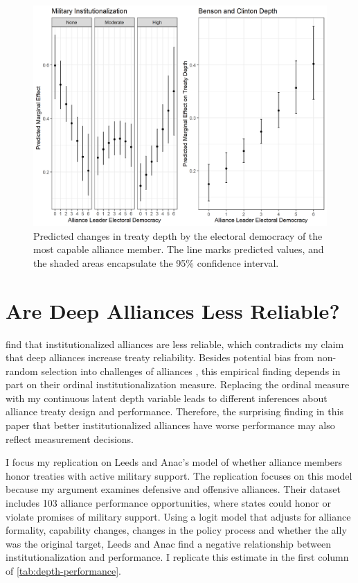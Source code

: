 \documentclass[12pt]{article}
\begin{document}
\begin{figure}
\includegraphics[width=.95\textwidth]{results-alt-measures-sep.png}  
\caption{Predicted changes in treaty depth by the electoral democracy of the most capable alliance member. The line marks predicted values, and the shaded areas encapsulate the 95\% confidence interval.}
\label{fig:results-alt-measures-sep}
\end{figure}



\section{Are Deep Alliances Less Reliable?} 


\citet{LeedsAnac2005} find that institutionalized alliances are less reliable, which contradicts my claim that deep alliances increase treaty reliability. 
Besides potential bias from non-random selection into challenges of alliances \citep{Smith1995}, this empirical finding depends in part on their ordinal institutionalization measure. 
Replacing the ordinal measure with my continuous latent depth variable leads to different inferences about alliance treaty design and performance. 
Therefore, the surprising finding in this paper that better institutionalized alliances have worse performance may also reflect measurement decisions. 


I focus my replication on Leeds and Anac's model of whether alliance members honor treaties with active military support. 
The replication focuses on this model because my argument examines defensive and offensive alliances. 
Their dataset includes 103 alliance performance opportunities, where states could honor or violate promises of military support. 
Using a logit model that adjusts for alliance formality, capability changes, changes in the policy process and whether the ally was the original target, Leeds and Anac find a negative relationship between institutionalization and performance. 
I replicate this estimate in the first column of \autoref{tab:depth-performance}. 
\end{document}
